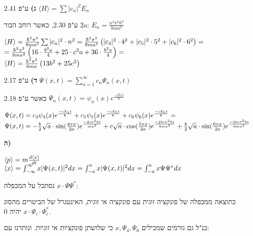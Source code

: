 \documentclass[14pt]{extarticle}
\makeatletter
\newenvironment{lefteqs}{%
    \begin{english}%
    \begin{flushleft}%
    \renewcommand{\arraystretch}{1.3}%
    $\begin{array}{@{}l@{}}%
}{%
    \end{array}$%
    \end{flushleft}%
    \end{english}%
}
\makeatother
\begin{document}
\textbf{ג)}
ע"פ 2.41 $\langle H \rangle = \sum |c_n|^2 E_n$

ע"פ 2.30, כאשר רוחב הבור $2a$: $E_n=\frac{n^2 \pi^2 \hbar^2}{8ma^2}$

\begin{lefteqs}
    \langle H \rangle = \frac{\hbar^2 \pi^2}{8ma^2} \sum |c_n|^2 \cdot n^2 = \frac{\hbar^2 \pi^2}{8ma^2} \left( |c_4|^2 \cdot 4^2 + |c_5|^2 \cdot 5^2 + |c_6|^2 \cdot 6^2 \right) = \\
    = \frac{\hbar^2 \pi^2}{8ma^2} \left( 16 \cdot \frac{b^2 a}{4} + 25 \cdot c^2 a + 36 \cdot \frac{b^2 a}{4} \right) = \\
    \langle H \rangle = \frac{\hbar^2 \pi^2}{8ma} \left( 13 b^2 + 25 c^2 \right)
\end{lefteqs}

\textbf{ד)}
ע"פ 2.17 $\Psi(x,t) = \sum_{n=1}^{\infty} c_n \Psi_n(x,t)$

כאשר ע"פ 2.18  $\Psi_n(x,t) = \psi_n(x) e^{\frac{-iE_n t}{\hbar}}$

\begin{lefteqs}
    \Psi(x,t) = c_4 \psi_4(x) e^{\frac{-iE_4 t}{\hbar}} + c_5 \psi_5(x) e^{\frac{-iE_5 t}{\hbar}} + c_6 \psi_6(x) e^{\frac{-iE_6 t}{\hbar}} = \\
    \Psi(x,t) = -\frac{b}{2} \sqrt{a} \cdot \sin(\frac{4\pi x}{2a}) e^{\frac{-2i\pi^2 \hbar t}{ma^2}} + c \sqrt{a} \cdot \cos(\frac{5\pi x}{2a}) e^{\frac{-25i\pi^2 \hbar t}{8ma^2}} + \frac{b}{2} \sqrt{a} \cdot \sin(\frac{6\pi x}{2a}) e^{\frac{-36i\pi^2 \hbar t}{8ma^2}}
\end{lefteqs}

\textbf{ה)}
\begin{lefteqs}
    \langle p \rangle = m \frac{d \langle x \rangle}{dt} \\
    \langle x \rangle = \int_{-\infty}^{\infty} x |\Psi(x,t)|^2 dx = \int_{-a}^{a} x |\Psi(x,t)|^2 dx = \int_{-a}^{a} x \Psi \Psi^{*} dx \\
\end{lefteqs}

נסתכל על המכפלה $x \cdot \Psi \Psi^{*}$:

כתוצאה ממכפלה של פונקציה זוגית עם פונקציה אי זוגית, האינטגרל של הביטויים מהסוג $x \cdot \Psi_i \cdot \Psi_i^{*}$ יהיה 0.

כנ"ל גם גורמים שמכילים $x, \Psi_4, \Psi_6$ כי שלושתן פונקציות אי זוגיות. ונותרנו עם:
\end{document}

